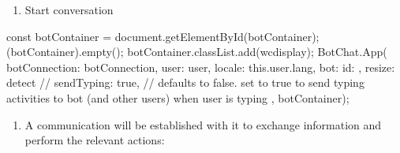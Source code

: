 \documentclass[letterpaper,10pt,english]{sphinxmanual}
\begin{document}
\begin{sphinxVerbatim}[commandchars=\\\{\}]
   
   \PYG{p}{[}\PYG{p}{]}
   
   
   
    
   
   
   
   
\end{sphinxVerbatim}
\begin{enumerate}
%
\item {} 
Start conversation

\end{enumerate}

\begin{sphinxVerbatim}[commandchars=\\\{\}]
const botContainer = document.getElementById(\PYGZsq{}botContainer\PYGZsq{});
\PYGZdl{}(\PYGZsq{}\PYGZsh{}botContainer\PYGZsq{}).empty();
botContainer.classList.add(\PYGZdq{}wc\PYGZhy{}display\PYGZdq{});   
BotChat.App(\PYGZob{}
    botConnection: botConnection,
    user: user,
    locale: this.user.lang,
    bot: \PYGZob{}id: \PYGZsq{}\PYGZsq{}\PYGZcb{},
    resize: \PYGZsq{}detect\PYGZsq{}
    // sendTyping: true,    // defaults to false. set to true to send \PYGZsq{}typing\PYGZsq{} activities to bot (and other users) when user is typing
\PYGZcb{}, botContainer);
\end{sphinxVerbatim}
\begin{enumerate}
%
\item {} 
A communication will be established with it to exchange information and perform the relevant actions:

\end{enumerate}
\end{document}
